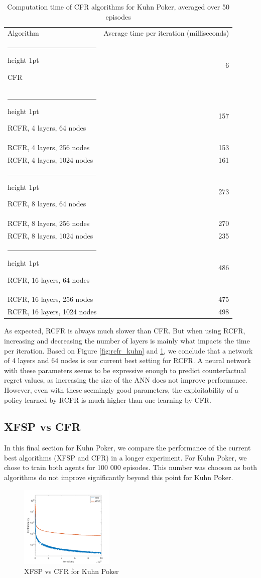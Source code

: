 \documentclass[10pt,a4paper]{article}
\makeatletter
\newcommand{\thickhline}{%
    \noalign {\ifnum 0=`}\fi \hrule height 1pt
    \futurelet \reserved@a \@xhline
}
\makeatother
\begin{document}
\begin{table}[h]
\centering
\begin{tabular}{|l|r|}
\hline
Algorithm & Average time per iteration (milliseconds)\\
\thickhline
CFR & 6 \\
\thickhline
RCFR, 4 layers, 64 nodes& 157 \\
\hline
RCFR, 4 layers, 256 nodes & 153 \\
\hline
RCFR, 4 layers, 1024 nodes & 161 \\
\thickhline
RCFR, 8 layers, 64 nodes & 273 \\
\hline
RCFR, 8 layers, 256 nodes  & 270 \\
\hline
RCFR, 8 layers, 1024 nodes  & 235 \\
\thickhline
RCFR, 16 layers, 64 nodes & 486 \\
\hline
RCFR, 16 layers, 256 nodes & 475 \\
\hline
RCFR, 16 layers, 1024 nodes & 498 \\
\hline
\end{tabular}
\caption{Computation time of CFR algorithms for Kuhn Poker, averaged over 50 episodes}
\label{tbl:kuhn_times}
\end{table}

As expected, RCFR is always much slower than CFR. But when using RCFR, increasing and decreasing the number of layers is mainly what impacts the time per iteration. Based on Figure \ref{fig:rcfr_kuhn} and \ref{tbl:kuhn_times}, we conclude that a network of 4 layers and 64 nodes is our current best setting for RCFR. A neural network with these parameters seems to be expressive enough to predict counterfactual regret values, as increasing the size of the ANN does not improve performance. However, even with these seemingly good parameters, the exploitability of a policy learned by RCFR is much higher than one learning by CFR. 

\subsection{XFSP vs CFR}
 In this final section for Kuhn Poker, we compare the performance of the current best algorithms (XFSP and CFR) in a longer experiment. For Kuhn Poker, we chose to train both agents for 100 000 episodes. This number was choosen as both algorithms do not improve significantly beyond this point for Kuhn Poker.

\begin{figure}[h]
\centering
\includegraphics[width=0.4\textwidth]{Figures/cfr_vs_xfsp_kuhn.png}
\caption{XFSP vs CFR for Kuhn Poker}
\end{figure}
\end{document}

